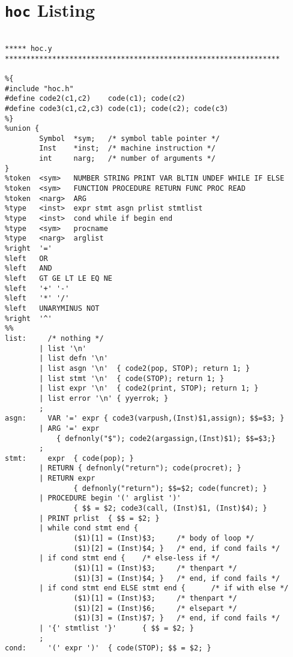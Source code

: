 \chapter{\texttt{hoc} Listing}
\label{chap:hoc_listing}

\begin{verbatim}

***** hoc.y ****************************************************************

%{
#include "hoc.h"
#define code2(c1,c2)    code(c1); code(c2)
#define code3(c1,c2,c3) code(c1); code(c2); code(c3)
%}
%union {
        Symbol  *sym;   /* symbol table pointer */
        Inst    *inst;  /* machine instruction */
        int     narg;   /* number of arguments */
}
%token  <sym>   NUMBER STRING PRINT VAR BLTIN UNDEF WHILE IF ELSE
%token  <sym>   FUNCTION PROCEDURE RETURN FUNC PROC READ
%token  <narg>  ARG
%type   <inst>  expr stmt asgn prlist stmtlist
%type   <inst>  cond while if begin end 
%type   <sym>   procname
%type   <narg>  arglist
%right  '='
%left   OR
%left   AND
%left   GT GE LT LE EQ NE
%left   '+' '-'
%left   '*' '/'
%left   UNARYMINUS NOT 
%right  '^'
%%
list:     /* nothing */
        | list '\n'
        | list defn '\n'
        | list asgn '\n'  { code2(pop, STOP); return 1; }
        | list stmt '\n'  { code(STOP); return 1; } 
        | list expr '\n'  { code2(print, STOP); return 1; }
        | list error '\n' { yyerrok; }
        ;
asgn:     VAR '=' expr { code3(varpush,(Inst)$1,assign); $$=$3; }
        | ARG '=' expr
            { defnonly("$"); code2(argassign,(Inst)$1); $$=$3;}
        ;
stmt:     expr  { code(pop); }
        | RETURN { defnonly("return"); code(procret); }
        | RETURN expr
                { defnonly("return"); $$=$2; code(funcret); }
        | PROCEDURE begin '(' arglist ')'
                { $$ = $2; code3(call, (Inst)$1, (Inst)$4); }
        | PRINT prlist  { $$ = $2; }
        | while cond stmt end {
                ($1)[1] = (Inst)$3;     /* body of loop */
                ($1)[2] = (Inst)$4; }   /* end, if cond fails */
        | if cond stmt end {    /* else-less if */
                ($1)[1] = (Inst)$3;     /* thenpart */
                ($1)[3] = (Inst)$4; }   /* end, if cond fails */
        | if cond stmt end ELSE stmt end {      /* if with else */
                ($1)[1] = (Inst)$3;     /* thenpart */
                ($1)[2] = (Inst)$6;     /* elsepart */
                ($1)[3] = (Inst)$7; }   /* end, if cond fails */
        | '{' stmtlist '}'      { $$ = $2; }
        ;
cond:     '(' expr ')'  { code(STOP); $$ = $2; }

\end{verbatim}
